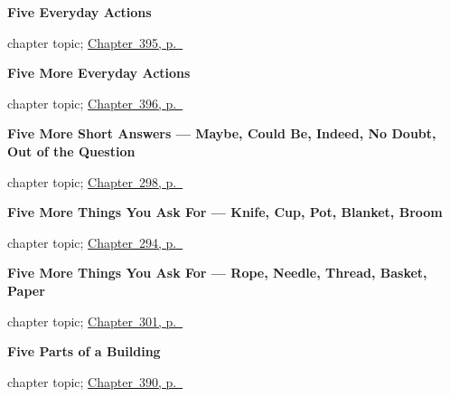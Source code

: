 \noindent\begin{minipage}[t]{\linewidth}
\raggedright
\textbf{Five Everyday Actions}\par
\footnotesize chapter topic; \hyperref[ch:entrar-y-volver]{Chapter~395, p.~\pageref*{ch:entrar-y-volver}}
\end{minipage}\par\smallskip

\noindent\begin{minipage}[t]{\linewidth}
\raggedright
\textbf{Five More Everyday Actions}\par
\footnotesize chapter topic; \hyperref[ch:aprender-y-cocinar]{Chapter~396, p.~\pageref*{ch:aprender-y-cocinar}}
\end{minipage}\par\smallskip

\noindent\begin{minipage}[t]{\linewidth}
\raggedright
\textbf{Five More Short Answers --- Maybe, Could Be, Indeed, No Doubt, Out of the Question}\par
\footnotesize chapter topic; \hyperref[ch:mas-respuestas]{Chapter~298, p.~\pageref*{ch:mas-respuestas}}
\end{minipage}\par\smallskip

\noindent\begin{minipage}[t]{\linewidth}
\raggedright
\textbf{Five More Things You Ask For --- Knife, Cup, Pot, Blanket, Broom}\par
\footnotesize chapter topic; \hyperref[ch:cinco-cosas-mas]{Chapter~294, p.~\pageref*{ch:cinco-cosas-mas}}
\end{minipage}\par\smallskip

\noindent\begin{minipage}[t]{\linewidth}
\raggedright
\textbf{Five More Things You Ask For --- Rope, Needle, Thread, Basket, Paper}\par
\footnotesize chapter topic; \hyperref[ch:mas-cosas-que-pedir]{Chapter~301, p.~\pageref*{ch:mas-cosas-que-pedir}}
\end{minipage}\par\smallskip

\noindent\begin{minipage}[t]{\linewidth}
\raggedright
\textbf{Five Parts of a Building}\par
\footnotesize chapter topic; \hyperref[ch:la-terraza-y-la-sala]{Chapter~390, p.~\pageref*{ch:la-terraza-y-la-sala}}
\end{minipage}\par\smallskip

